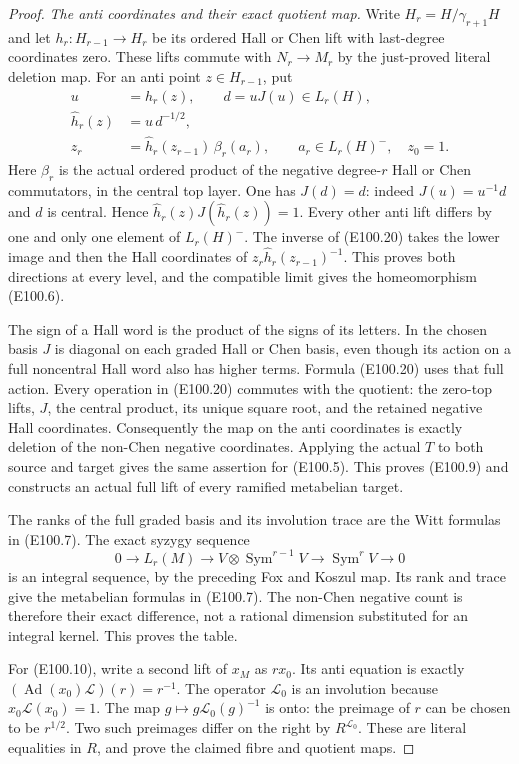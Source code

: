 \begin{proof}
\emph{The anti coordinates and their exact quotient map.}
Write $H_r=H/\gamma_{r+1}H$ and let
$h_r:H_{r-1}\to H_r$ be its ordered
Hall or Chen lift with last-degree
coordinates zero. These lifts commute
with $N_r\to M_r$ by the just-proved
literal deletion map. For an anti point
$z\in H_{r-1}$, put
\[
\begin{aligned}
 u&=h_r(z),\qquad d=uJ(u)\in L_r(H),\\
 \widehat h_r(z)&=u\,d^{-1/2},\\
 z_r&=\widehat h_r(z_{r-1})\,\beta_r(a_r),
       \qquad a_r\in L_r(H)^-,\quad z_0=1 .
\end{aligned}
 \tag{E100.20}
\]
Here $\beta_r$ is the actual ordered product
of the negative degree-$r$ Hall or Chen
commutators, in the central top layer.
One has $J(d)=d$: indeed $J(u)=u^{-1}d$
and $d$ is central. Hence
$\widehat h_r(z)J(\widehat h_r(z))=1$.
Every other anti lift differs by one
and only one element of $L_r(H)^-$.
The inverse of (E100.20) takes the
lower image and then the Hall coordinates
of $z_r\widehat h_r(z_{r-1})^{-1}$.
This proves both directions at every
level, and the compatible limit gives
the homeomorphism (E100.6).

The sign of a Hall word is the product
of the signs of its letters. In the
chosen basis $J$ is diagonal on each
graded Hall or Chen basis, even though
its action on a full noncentral Hall
word also has higher terms. Formula
(E100.20) uses that full action.
Every operation in (E100.20) commutes
with the quotient: the zero-top lifts,
$J$, the central product, its unique
square root, and the retained negative
Hall coordinates. Consequently the
map on the anti coordinates is exactly
deletion of the non-Chen negative
coordinates. Applying the actual $T$
to both source and target gives the
same assertion for (E100.5).
This proves (E100.9) and constructs
an actual full lift of every ramified
metabelian target.

The ranks of the full graded basis
and its involution trace are the
Witt formulas in (E100.7).
The exact syzygy sequence
\[
 0\longrightarrow L_r(M)\longrightarrow
 V\otimes\operatorname{Sym}^{r-1}V
           \longrightarrow\operatorname{Sym}^rV
 \longrightarrow0
 \tag{E100.21}
\]
is an integral sequence, by the preceding
Fox and Koszul map. Its rank and trace
give the metabelian formulas in (E100.7).
The non-Chen negative count is therefore
their exact difference, not a rational
dimension substituted for an integral
kernel. This proves the table.

For (E100.10), write a second lift of
$x_M$ as $r x_0$. Its anti equation is
exactly
$(\operatorname{Ad}(x_0)\mathcal L)(r)=r^{-1}$.
The operator $\mathcal L_0$ is an
involution because $x_0\mathcal L(x_0)=1$.
The map $g\mapsto g\mathcal L_0(g)^{-1}$
is onto: the preimage of $r$ can be
chosen to be $r^{1/2}$. Two such
preimages differ on the right by
$R^{\mathcal L_0}$. These are literal
equalities in $R$, and prove the
claimed fibre and quotient maps.


\end{proof}
